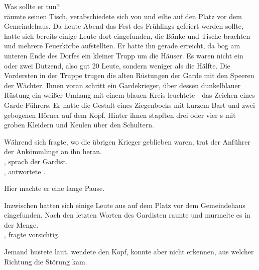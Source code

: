 \begin{Large}
Was sollte er tun?\\
{\Nox} räumte seinen Tisch, verabschiedete sich von {\Mena} und eilte auf den Platz vor dem Gemeindehaus. Da heute Abend das Fest des Frühlings gefeiert werden sollte, hatte sich bereits einige Leute dort eingefunden, die Bänke und Tische brachten und mehrere Feuerkörbe aufstellten. Er hatte ihn gerade erreicht, da bog am unteren Ende des Dorfes ein kleiner Trupp um die Häuser. Es waren nicht ein oder zwei Dutzend, also gut 20 Leute, sondern weniger als die Hälfte. Die Vordersten in der Truppe trugen die alten Rüstungen der Garde mit den Speeren der Wächter. Ihnen voran schritt ein Gardekrieger, über dessen dunkelblauer Rüstung ein weißer Umhang mit einem blauen Kreis leuchtete - das Zeichen eines Garde-Führers. Er hatte die Gestalt eines Ziegenbocks mit kurzem Bart und zwei gebogenen Hörner auf dem Kopf. Hinter ihnen stapften drei oder vier {\Bangiri}s mit groben Kleidern und Keulen über den Schultern.

Während {\Nox} sich fragte, wo die übrigen Krieger geblieben waren, trat der Anführer der Ankömmlinge an ihn heran.\\, sprach der Gardist.\\
, antwortete {\Nox}. 

 Hier machte er eine lange Pause. 

Inzwischen hatten sich einige Leute aus {\Berna} auf dem Platz vor dem Gemeindehaus eingefunden. Nach den letzten Worten des Gardisten raunte und murmelte es in der Menge.\\
, fragte {\Nox} vorsichtig. 

 Jemand hustete laut. {\Spaltfuss} wendete den Kopf, konnte aber nicht erkennen, aus welcher Richtung die Störung kam.


\end{Large}
